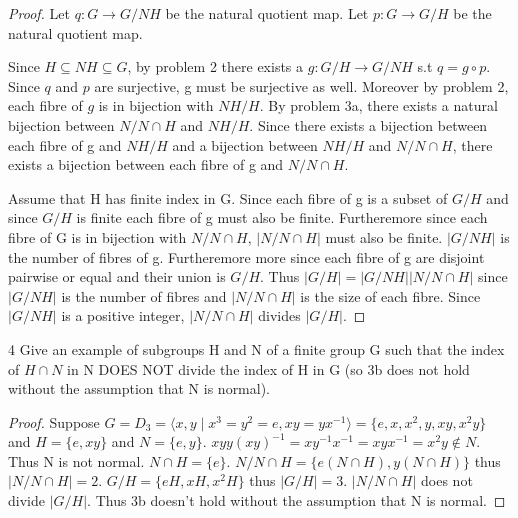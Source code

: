 \documentclass{article}
\newcommand{\abs}[1]{\lvert #1\rvert}
\begin{document}
\begin{proof}
    Let $q: G \to G/NH$ be the natural quotient map. Let $p: G \to G/H$ be the natural quotient map.

    Since $H \subseteq NH \subseteq G$, by problem 2 there exists a $g: G/H \to G/NH$ s.t $q = g \circ p$. Since $q$ and $p$ are surjective, g must be surjective as well. Moreover by problem 2, each fibre of $g$ is in bijection with $NH/H$. By problem 3a, there exists a natural bijection between $N/N \cap H$ and $NH/H$. Since there exists a bijection between each fibre of g and $NH/H$ and a bijection between $NH/H$ and $N/N \cap H$, there exists a bijection between each fibre of g and $N/N \cap H$.

    Assume that H has finite index in G. Since each fibre of g is a subset of $G/H$ and since $G/H$ is finite each fibre of g must also be finite. Furtheremore since each fibre of G is in bijection with $N/N \cap H$, $|N/N \cap H|$ must also be finite. $\abs{G/NH}$ is the number of fibres of g. Furtheremore more since each fibre of g are disjoint pairwise or equal and their union is $G/H$. Thus $\abs{G/H} = \abs{G/NH}\abs{N/N \cap H}$ since $\abs{G/NH}$ is the number of fibres and $\abs{N/N \cap H}$ is the size of each fibre. Since $\abs{G/NH}$ is a positive integer, $\abs{N/N \cap H}$ divides $\abs{G/H}$.
\end{proof}

\bigskip

\begin{PROB}{4}\label{Problem 4.}
    Give an example of subgroups H and N of a finite group G such that the index of $H \cap N$ in N DOES NOT divide the index of  H in G (so 3b does not hold without the assumption that N is normal). 
\end{PROB}
\begin{proof}
    Suppose $G = D_3 = \langle{x, y \mid x^3 = y^2 = e, xy = yx^{-1}} \rangle = \{e, x, x^2, y, xy, x^2y\}$ and $H = \{e, xy\}$ and $N = \{e, y\}$. $xyy(xy)^{-1} = xy^{-1}x^{-1} = xyx^{-1} = x^2y \not \in N$. Thus N is not normal. $N \cap H = \{e\}$. $N/N \cap H = \{e(N \cap H), y(N \cap H)\}$ thus $\abs{N/N \cap H} = 2$. $G/H = \{eH, xH, x^2H\}$ thus $\abs{G/H} = 3$. $\abs{N/N\cap H}$ does not divide $\abs{G/H}$. Thus 3b doesn't hold without the assumption that N is normal.
\end{proof}
\end{document}
